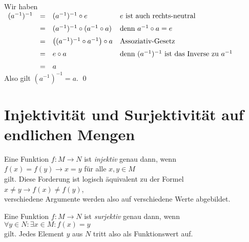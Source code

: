 \proof
Wir haben
\\[0.2cm]
\hspace*{1.3cm}
$
\begin{array}[t]{lcll}
  (a^{-1})^{-1} & = & (a^{-1})^{-1} \circ e
                    & \mbox{$e$ ist auch rechts-neutral}                      \\[0.2cm]
                & = & (a^{-1})^{-1} \circ (a^{-1} \circ a)
                    & \mbox{denn $a^{-1} \circ a = e$}                        \\[0.2cm]
                & = & \bigl((a^{-1})^{-1} \circ a^{-1}\bigr) \circ a
                    & \mbox{Assoziativ-Gesetz}                                \\[0.2cm]
                & = & e \circ a
                    & \mbox{denn $(a^{-1})^{-1}$ ist das Inverse zu $a^{-1}$} \\[0.2cm]
                & = & a
\end{array}
$
\\[0.2cm]
Also gilt $(a^{-1})^{-1} = a$. \qed

\section{Injektivit\"{a}t und Surjektivit\"{a}t auf endlichen Mengen}

\begin{Definition}[injektiv]
  Eine Funktion $f: M \rightarrow N$ ist {\emph{\color{blue}injektiv}} genau dann, wenn
  \\[0.2cm]
  \hspace*{1.3cm}
  $f(x) = f(y) \rightarrow x = y$ \quad f\"{u}r alle $x,y\in M$ 
  \\[0.2cm]
  gilt.  Diese Forderung ist logisch \"{a}quivalent zu der Formel
  \\[0.2cm]
  \hspace*{1.3cm}
  $x \not= y \rightarrow f(x) \not= f(y)$,
  \\[0.2cm]
  verschiedene Argumente werden also auf verschiedene Werte abgebildet.
\eoxs
\end{Definition}

\begin{Definition}[surjektiv]
  Eine Funktion $f: M \rightarrow N$ ist {\emph{\color{blue}surjektiv}} genau dann, wenn
  \\[0.2cm]
  \hspace*{1.3cm}
  $\forall y \in N: \exists x \in M: f(x) = y$ 
  \\[0.2cm]
  gilt.  Jedes Element $y$ aus $N$ tritt also als Funktionswert auf.
\eoxs
\end{Definition}

